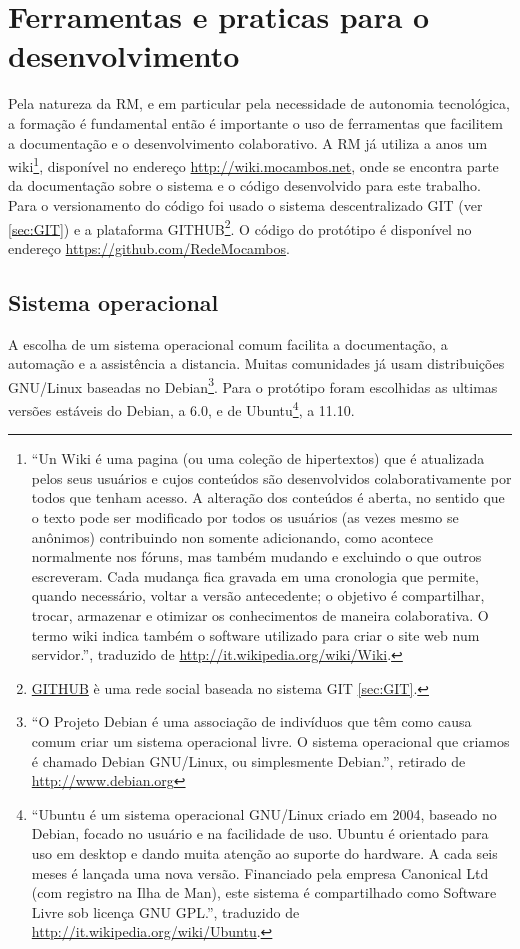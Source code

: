 \section{Ferramentas e praticas para o desenvolvimento}
Pela natureza da RM, e em particular pela necessidade de autonomia
tecnológica, a formação é fundamental então é importante o uso de
ferramentas que facilitem a documentação e o desenvolvimento
colaborativo. A RM já utiliza a anos um wiki\footnote{``Un Wiki é uma
  pagina (ou uma coleção de hipertextos) que é atualizada pelos seus
  usuários e cujos conteúdos são desenvolvidos colaborativamente por
  todos que tenham acesso. A alteração dos conteúdos é aberta, no
  sentido que o texto pode ser modificado por todos os usuários (as
  vezes mesmo se anônimos) contribuindo non somente adicionando, como
  acontece normalmente nos fóruns, mas também mudando e excluindo o
  que outros escreveram. Cada mudança fica gravada em uma cronologia
  que permite, quando necessário, voltar a versão antecedente; o
  objetivo é compartilhar, trocar, armazenar e otimizar os
  conhecimentos de maneira colaborativa. O termo wiki indica também o
  software utilizado para criar o site web num servidor.'', traduzido
  de \url{http://it.wikipedia.org/wiki/Wiki}.}, disponível no endereço
\url{http://wiki.mocambos.net}, onde se encontra parte da documentação
sobre o sistema e o código desenvolvido para este trabalho. Para o
versionamento do código foi usado o sistema descentralizado GIT (ver
\ref{sec:GIT}) e a plataforma
GITHUB\footnote{\href{http://github.com}{GITHUB} è uma rede social
  baseada no sistema GIT \ref{sec:GIT}.}. O código do protótipo é
disponível no endereço \url{https://github.com/RedeMocambos}.

\subsection{Sistema operacional}
A escolha de um sistema operacional comum facilita a documentação, a
automação e a assistência a distancia. Muitas comunidades já usam
distribuições GNU/Linux baseadas no Debian\footnote{``O Projeto Debian
  é uma associação de indivíduos que têm como causa comum criar um
  sistema operacional livre. O sistema operacional que criamos é
  chamado Debian GNU/Linux, ou simplesmente Debian.'', retirado de
  \url{http://www.debian.org}}. Para o protótipo foram escolhidas as
ultimas versões estáveis do Debian, a 6.0, e de
Ubuntu\footnote{``Ubuntu é um sistema operacional GNU/Linux criado em
  2004, baseado no Debian, focado no usuário e na facilidade de
  uso. Ubuntu é orientado para uso em desktop e dando muita atenção ao
  suporte do hardware. A cada seis meses é lançada uma nova
  versão. Financiado pela empresa Canonical Ltd (com registro na Ilha
  de Man), este sistema é compartilhado como Software Livre sob
  licença GNU GPL.'', traduzido de
  \url{http://it.wikipedia.org/wiki/Ubuntu}.}, a 11.10.

